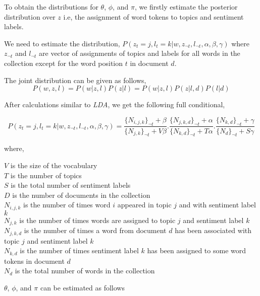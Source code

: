 To obtain the distributions for \(\theta\), \(\phi\), and \(\pi\), we firstly estimate the posterior distribution over \(z\) i.e, the assignment of word tokens to
topics and sentiment labels.

We need to estimate the distribution, \(P(z_t=j,l_t=k|w,z_{\neg t},l_{\neg t},\alpha,\beta,\gamma)\) where \(z_{\neg t}\) and \(l_{\neg t}\) are vector of assignments
of topics and labels for all words in the collection except for the word position \(t\) in document \(d\). 

The joint distribution can be given as follows,
\begin{equation}
P(w,z,l) = P(w|z,l)P(z|l) = P(w|z,l)P(z|l,d)P(l|d)
\end{equation}

After calculations similar to \textit{LDA}, we get the following full conditional,

\begin{equation}
P(z_t=j,l_t=k|w,z_{\neg t},l_{\neg t},\alpha,\beta,\gamma) = 
\frac{\{N_{i,j,k}\}_{\neg t} + \beta}{\{N_{j,k}\}_{\neg t}+V\beta}.
\frac{\{N_{j,k,d}\}_{\neg t} + \alpha}{\{N_{k,d}\}_{\neg t}+T\alpha}.
\frac{\{N_{k,d}\}_{\neg t} + \gamma}{\{N_{d}\}_{\neg t}+S\gamma}
\end{equation}

where,

\(V\) is the size of the vocabulary \\
\(T\) is the number of topics \\
\(S\) is the total number of sentiment labels \\
\(D\) is the number of documents in the collection \\
\(N_{i,j,k}\) is the number of times word \(i\) appeared in topic \(j\) and with sentiment label \(k\) \\
\(N_{j,k}\) is the number of times words are assigned to topic \(j\) and sentiment label \(k\) \\
\(N_{j,k,d}\) is the number of times a word from document \(d\) has been associated with topic \(j\) and sentiment label \(k\) \\
\(N_{k,d}\) is the number of times sentiment label \(k\) has been assigned to some word tokens in document \(d\) \\
\(N_{d}\) is the total number of words in the collection \\

\par

\(\theta\), \(\phi\), and \(\pi\) can be estimated as follows


